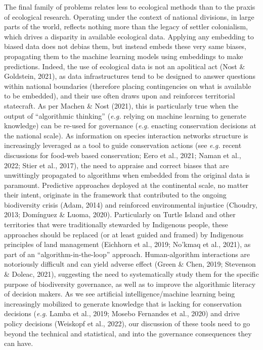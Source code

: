\documentclass[10pt,oneside]{article}
\begin{document}
The final family of problems relates less to ecological methods than to
the praxis of ecological research. Operating under the context of
national divisions, in large parts of the world, reflects nothing more
than the legacy of settler colonialism, which drives a disparity in
available ecological data. Applying any embedding to biased data does
not debias them, but instead embeds these very same biases, propagating
them to the machine learning models using embeddings to make
predictions. Indeed, the use of ecological data is not an apolitical act
(Nost \& Goldstein, 2021), as data infrastructures tend to be designed
to answer questions within national boundaries (therefore placing
contingencies on what is available to be embedded), and their use often
draws upon and reinforces territorial statecraft. As per Machen \& Nost
(2021), this is particularly true when the output of ``algorithmic
thinking'' (\emph{e.g.} relying on machine learning to generate
knowledge) can be re-used for governance (\emph{e.g.} enacting
conservation decisions at the national scale). As information on species
interaction networks structure is increasingly leveraged as a tool to
guide conservation actions (see \emph{e.g.} recent discussions for
food-web based conservation; Eero et al., 2021; Naman et al., 2022;
Stier et al., 2017), the need to appraise and correct biases that are
unwittingly propagated to algorithms when embedded from the original
data is paramount. Predictive approaches deployed at the continental
scale, no matter their intent, originate in the framework that
contributed to the ongoing biodiversity crisis (Adam, 2014) and
reinforced environmental injustice (Choudry, 2013; Domínguez \& Luoma,
2020). Particularly on Turtle Island and other territories that were
traditionally stewarded by Indigenous people, these approaches should be
replaced (or at least guided and framed) by Indigenous principles of
land management (Eichhorn et al., 2019; No'kmaq et al., 2021), as part
of an ``algorithm-in-the-loop'' approach. Human-algorithm interactions
are notoriously difficult and can yield adverse effect (Green \& Chen,
2019; Stevenson \& Doleac, 2021), suggesting the need to systematically
study them for the specific purpose of biodiversity governance, as well
as to improve the algorithmic literacy of decision makers. As we see
artificial intelligence/machine learning being increasingly mobilized to
generate knowledge that is lacking for conservation decisions
(\emph{e.g.} Lamba et al., 2019; Mosebo Fernandes et al., 2020) and
drive policy decisions (Weiskopf et al., 2022), our discussion of these
tools need to go beyond the technical and statistical, and into the
governance consequences they can have.
\end{document}
